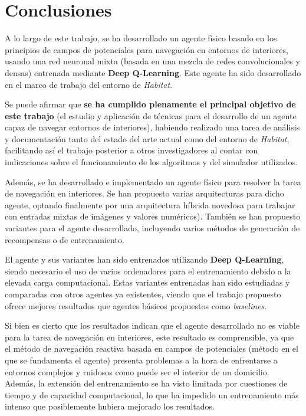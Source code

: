\chapter{Conclusiones}

A lo largo de este trabajo, se ha desarrollado un agente físico basado en los principios de campos de potenciales para navegación en entornos de interiores, usando una red neuronal mixta (basada en una mezcla de redes convolucionales y densas) entrenada mediante \textbf{Deep Q-Learning}. Este agente ha sido desarrollado en el marco de trabajo del entorno de \textit{Habitat}.

Se puede afirmar que \textbf{se ha cumplido plenamente el principal objetivo de este trabajo} (el estudio y aplicación de técnicas para el desarrollo de un agente capaz de navegar entornos de interiores), habiendo realizado una tarea de análisis y documentación tanto del estado del arte actual como del entorno de \textit{Habitat}, facilitando así el trabajo posterior a otros investigadores al contar con indicaciones sobre el funcionamiento de los algoritmos y del simulador utilizados.

Además, se ha desarrollado e implementado un agente físico para resolver la tarea de navegación en interiores. Se han propuesto varias arquitecturas para dicho agente, optando finalmente por una arquitectura híbrida novedosa para trabajar con entradas mixtas de imágenes y valores numéricos). También se han propuesto variantes para el agente desarrollado, incluyendo varios métodos de generación de recompensas o de entrenamiento.

El agente y sus variantes han sido entrenados utilizando \textbf{Deep Q-Learning}, siendo necesario el uso de varios ordenadores para el entrenamiento debido a la elevada carga computacional. Estas variantes entrenadas han sido estudiadas y comparadas con otros agentes ya existentes, viendo que el trabajo propuesto ofrece mejores resultados que agentes básicos propuestos como \textit{baselines}.

Si bien es cierto que los resultados indican que el agente desarrollado no es viable para la tarea de navegación en interiores, este resultado es comprensible, ya que el método de navegación reactiva basada en campos de potenciales (método en el que se fundamenta el agente) presenta problemas a la hora de enfrentarse a entornos complejos y ruidosos como puede ser el interior de un domicilio. Además, la extensión del entrenamiento se ha visto limitada por cuestiones de tiempo y de capacidad computacional, lo que ha impedido un entrenamiento más intenso que posiblemente hubiera mejorado los resultados.

